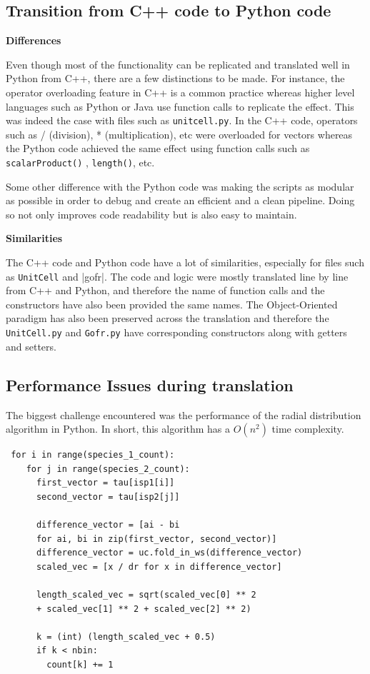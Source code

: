 \subsection*{Transition from C++ code to Python code}


\textbf{Differences}

Even though most of the functionality can be replicated and translated well in Python from C++, there are a few distinctions to be made. For instance, the operator overloading feature in C++ is a common practice whereas higher level languages such as Python or Java use function calls to replicate the effect. This was indeed the case with files such as \verb|unitcell.py|. In the C++ code, operators such as / (division), * (multiplication), etc were overloaded for vectors whereas the Python code achieved the same effect using function calls such as \verb|scalarProduct()| , \verb|length()|, etc.

Some other difference with the Python code was making the scripts as modular as possible in order to debug and create an efficient and a clean pipeline. Doing so not only improves code readability but is also easy to maintain. 

\textbf{Similarities}

The C++ code and Python code have a lot of similarities, especially for files such as \verb|UnitCell| and |gofr|. The code and logic were mostly translated line by line from C++ and Python, and therefore the name of function calls and the constructors have also been provided the same names. The Object-Oriented paradigm has also been preserved across the translation and therefore the \verb|UnitCell.py| and \verb|Gofr.py| have corresponding constructors along with getters and setters. 

\subsection*{Performance Issues during translation}

The biggest challenge encountered was the performance of the radial distribution algorithm in Python. In short, this algorithm has a $O(n^2)$ time complexity.  

\begin{verbatim}
 for i in range(species_1_count):
    for j in range(species_2_count):
      first_vector = tau[isp1[i]]
      second_vector = tau[isp2[j]]
      
      difference_vector = [ai - bi 
      for ai, bi in zip(first_vector, second_vector)]
      difference_vector = uc.fold_in_ws(difference_vector)
      scaled_vec = [x / dr for x in difference_vector]
      
      length_scaled_vec = sqrt(scaled_vec[0] ** 2 
      + scaled_vec[1] ** 2 + scaled_vec[2] ** 2)
     
      k = (int) (length_scaled_vec + 0.5)
      if k < nbin:
        count[k] += 1
\end{verbatim}

